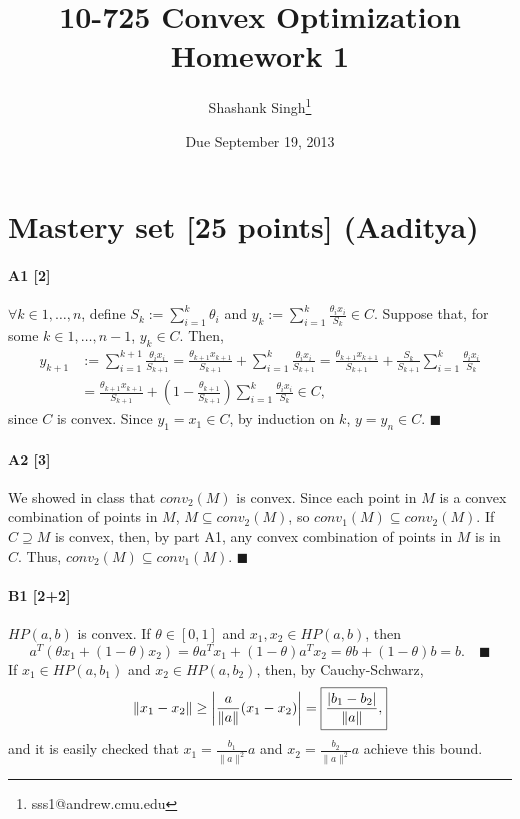 \documentclass[11pt]{article}
\title{10-725 Convex Optimization\\Homework 1}
\author{Shashank Singh\footnote{sss1@andrew.cmu.edu}}
\date{Due September 19, 2013}
\newcommand{\qed}{\quad \ensuremath{\blacksquare}}      %
\begin{document}
\maketitle

\newpage
\section{Mastery set [25 points] (Aaditya)}
\paragraph{A1 [2]}
$\forall k \in {1,\ldots,n}$, define $S_k := \sum_{i = 1}^k \theta_i$ and
$\displaystyle y_k :=
 \sum_{i = 1}^k \frac{\theta_ix_i}{S_k} \in C$. Suppose
that, for some $k \in {1,\ldots,n-1}$, $y_k \in C$. Then,
\begin{align*}
y_{k + 1}
 & := \sum_{i = 1}^{k + 1} \frac{\theta_ix_i}{S_{k + 1}}
   = \frac{\theta_{k + 1}x_{k + 1}}{S_{k + 1}}
   + \sum_{i = 1}^k \frac{\theta_ix_i}{S_{k + 1}}
   = \frac{\theta_{k + 1}x_{k + 1}}{S_{k + 1}}
   + \frac{S_k}{S_{k + 1}}
     \sum_{i = 1}^k \frac{\theta_ix_i}{S_k} \\
 & = \frac{\theta_{k + 1}x_{k + 1}}{S_{k + 1}}
   + \left( 1 - \frac{\theta_{k + 1}}{S_{k + 1}} \right)
     \sum_{i = 1}^k \frac{\theta_ix_i}{S_k}
   \in C,
\end{align*}
since $C$ is convex. Since $y_1 = x_1 \in C$, by induction on $k$,
$y = y_n \in C$. \qed

\paragraph{A2 [3]}
We showed in class that $conv_2(M)$ is convex. Since each point in $M$ is a
convex combination of points in $M$, $M \subseteq conv_2(M)$, so
$conv_1(M) \subseteq conv_2(M)$. If $C \supseteq M$ is convex, then, by part
A1, any convex combination of points in $M$ is in $C$. Thus,
$conv_2(M) \subseteq conv_1(M)$. \qed

\paragraph{B1 [2+2]}
$HP(a,b)$ is convex. If $\theta \in [0,1]$ and $x_1,x_2 \in HP(a,b)$, then
\[a^T (\theta x_1 + (1 - \theta)x_2)
 = \theta a^Tx_1 + (1 - \theta)a^Tx_2
 = \theta b + (1 - \theta)b
 = b. \qed
\]
If $x_1 \in HP(a,b_1)$ and $x_2 \in HP(a,b_2)$, then, by Cauchy-Schwarz,
\[\|x_1 - x_2\| \geq \left| \frac{a}{\|a\|}(x_1 - x_2) \right|
    = \mbox{\fbox{$\displaystyle \frac{|b_1 - b_2|}{\|a\|}$,}}\]
and it is easily checked that $x_1 = \frac{b_1}{\|a\|^2}a$ and
$x_2 = \frac{b_2}{\|a\|^2}a$ achieve this bound.
\end{document}
